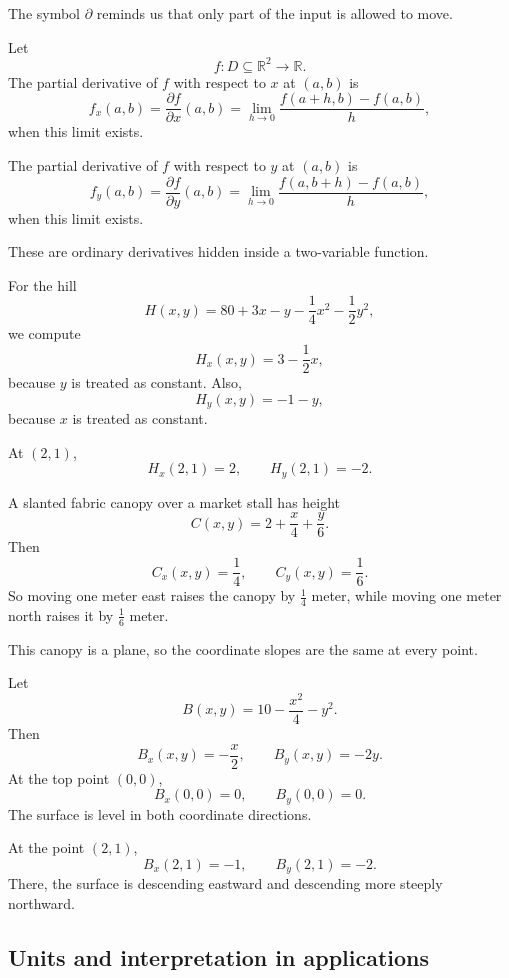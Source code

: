 The symbol \(\partial\) reminds us that only part of the input is allowed to move.

\begin{definition}
Let
\[
    f:D\subseteq\mathbb R^2\to\mathbb R.
\]
The partial derivative of \(f\) with respect to \(x\) at \((a,b)\) is
\[
\boxed{
    f_x(a,b)
    =
    \frac{\partial f}{\partial x}(a,b)
    =
    \lim_{h\to0}\frac{f(a+h,b)-f(a,b)}{h},
}
\]
when this limit exists.

The partial derivative of \(f\) with respect to \(y\) at \((a,b)\) is
\[
\boxed{
    f_y(a,b)
    =
    \frac{\partial f}{\partial y}(a,b)
    =
    \lim_{h\to0}\frac{f(a,b+h)-f(a,b)}{h},
}
\]
when this limit exists.
\end{definition}

These are ordinary derivatives hidden inside a two-variable function.

For the hill
\[
    H(x,y)=80+3x-y-\frac14 x^2-\frac12 y^2,
\]
we compute
\[
    H_x(x,y)=3-\frac12x,
\]
because \(y\) is treated as constant.  Also,
\[
    H_y(x,y)=-1-y,
\]
because \(x\) is treated as constant.

At \((2,1)\),
\[
    H_x(2,1)=2,
    \qquad
    H_y(2,1)=-2.
\]

\begin{example}
A slanted fabric canopy over a market stall has height
\[
    C(x,y)=2+\frac{x}{4}+\frac{y}{6}.
\]
Then
\[
    C_x(x,y)=\frac14,
    \qquad
    C_y(x,y)=\frac16.
\]
So moving one meter east raises the canopy by \(\frac14\) meter, while moving one meter
north raises it by \(\frac16\) meter.

This canopy is a plane, so the coordinate slopes are the same at every point.
\end{example}

\begin{example}
Let
\[
    B(x,y)=10-\frac{x^2}{4}-y^2.
\]
Then
\[
    B_x(x,y)=-\frac{x}{2},
    \qquad
    B_y(x,y)=-2y.
\]
At the top point \((0,0)\),
\[
    B_x(0,0)=0,
    \qquad
    B_y(0,0)=0.
\]
The surface is level in both coordinate directions.

At the point \((2,1)\),
\[
    B_x(2,1)=-1,
    \qquad
    B_y(2,1)=-2.
\]
There, the surface is descending eastward and descending more steeply northward.
\end{example}

\subsection{Units and interpretation in applications}

